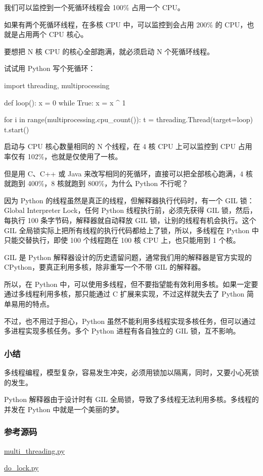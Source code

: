 我们可以监控到一个死循环线程会 100\% 占用一个 CPU。

如果有两个死循环线程，在多核 CPU 中，可以监控到会占用 200\% 的
CPU，也就是占用两个 CPU 核心。

要想把 N 核 CPU 的核心全部跑满，就必须启动 N 个死循环线程。

试试用 Python 写个死循环：

\begin{pythoncode}
import threading, multiprocessing

def loop():
    x = 0
    while True:
        x = x ^ 1

for i in range(multiprocessing.cpu_count()):
    t = threading.Thread(target=loop)
    t.start()
\end{pythoncode}

启动与 CPU 核心数量相同的 N 个线程，在 4 核 CPU 上可以监控到 CPU
占用率仅有 102\%，也就是仅使用了一核。

但是用 C、C++ 或 Java 来改写相同的死循环，直接可以把全部核心跑满，4
核就跑到 400\%，8 核就跑到 800\%，为什么 Python 不行呢？

因为 Python 的线程虽然是真正的线程，但解释器执行代码时，有一个 GIL
锁：Global Interpreter Lock，任何 Python 线程执行前，必须先获得 GIL
锁，然后，每执行 100 条字节码，解释器就自动释放 GIL
锁，让别的线程有机会执行。这个 GIL
全局锁实际上把所有线程的执行代码都给上了锁，所以，多线程在 Python
中只能交替执行，即使 100 个线程跑在 100 核 CPU 上，也只能用到 1 个核。

GIL 是 Python 解释器设计的历史遗留问题，通常我们用的解释器是官方实现的
CPython，要真正利用多核，除非重写一个不带 GIL 的解释器。

所以，在 Python
中，可以使用多线程，但不要指望能有效利用多核。如果一定要通过多线程利用多核，那只能通过
C 扩展来实现，不过这样就失去了 Python 简单易用的特点。

不过，也不用过于担心，Python
虽然不能利用多线程实现多核任务，但可以通过多进程实现多核任务。多个
Python 进程有各自独立的 GIL 锁，互不影响。

\hypertarget{ux5c0fux7ed3}{%
\subsubsection{小结}\label{ux5c0fux7ed3}}

多线程编程，模型复杂，容易发生冲突，必须用锁加以隔离，同时，又要小心死锁的发生。

Python 解释器由于设计时有 GIL
全局锁，导致了多线程无法利用多核。多线程的并发在 Python
中就是一个美丽的梦。

\hypertarget{ux53c2ux8003ux6e90ux7801}{%
\subsubsection{参考源码}\label{ux53c2ux8003ux6e90ux7801}}

\href{https://github.com/michaelliao/learn-python3/blob/master/samples/multitask/multi_threading.py}{multi\_threading.py}

\href{https://github.com/michaelliao/learn-python3/blob/master/samples/multitask/do_lock.py}{do\_lock.py}

